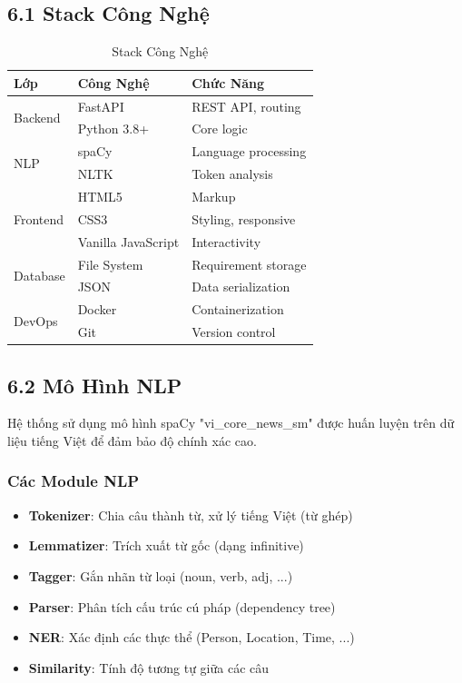 \documentclass[14pt,a4paper]{article}
\begin{document}
\subsection{6.1 Stack Công Nghệ}

\begin{table}[h]
\centering
\begin{tabular}{|l|l|l|}
\hline
\textbf{Lớp} & \textbf{Công Nghệ} & \textbf{Chức Năng} \\
\hline
\multirow{2}{*}{Backend} & FastAPI & REST API, routing \\
& Python 3.8+ & Core logic \\
\hline
\multirow{2}{*}{NLP} & spaCy & Language processing \\
& NLTK & Token analysis \\
\hline
\multirow{3}{*}{Frontend} & HTML5 & Markup \\
& CSS3 & Styling, responsive \\
& Vanilla JavaScript & Interactivity \\
\hline
\multirow{2}{*}{Database} & File System & Requirement storage \\
& JSON & Data serialization \\
\hline
\multirow{2}{*}{DevOps} & Docker & Containerization \\
& Git & Version control \\
\hline
\end{tabular}
\caption{Stack Công Nghệ}
\end{table}

\subsection{6.2 Mô Hình NLP}

Hệ thống sử dụng mô hình spaCy "vi\_core\_news\_sm" được huấn luyện trên dữ liệu 
tiếng Việt để đảm bảo độ chính xác cao.

\subsubsection{Các Module NLP}

\begin{itemize}
    \item \textbf{Tokenizer}: Chia câu thành từ, xử lý tiếng Việt (từ ghép)
    \item \textbf{Lemmatizer}: Trích xuất từ gốc (dạng infinitive)
    \item \textbf{Tagger}: Gắn nhãn từ loại (noun, verb, adj, ...)
    \item \textbf{Parser}: Phân tích cấu trúc cú pháp (dependency tree)
    \item \textbf{NER}: Xác định các thực thể (Person, Location, Time, ...)
    \item \textbf{Similarity}: Tính độ tương tự giữa các câu
\end{itemize}
\end{document}
